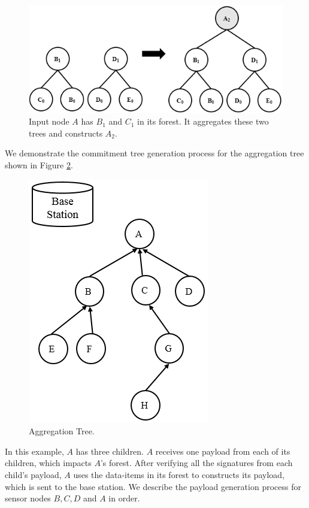 	\begin{figure}[h!]
		\includegraphics{images/increase-height.png}
		\caption{Input node $A$ has $B_{1}$ and $C_{1}$ in its forest. It aggregates these two trees and constructs $A_{2}$.}
		\label{fig:increase-height}
	\end{figure}
	
	We demonstrate the commitment tree generation process for the aggregation tree shown in Figure \ref{fig:Aggregation-tree-1}.
	\begin{figure}[h!]
		\centering
		\includegraphics{images/aggregation-tree-1.png}
		\caption{Aggregation Tree.}
		\label{fig:Aggregation-tree-1}
	\end{figure}
	In this example, $A$ has three children.
	$A$ receives one payload from each of its children, which impacts $A$'s forest.
	After verifying all the signatures from each child's payload, $A$ uses the data-items in its forest to constructs its payload, which is sent to the base station.
	We describe the payload generation process for sensor nodes $B,C,D$ and $A$ in order.

